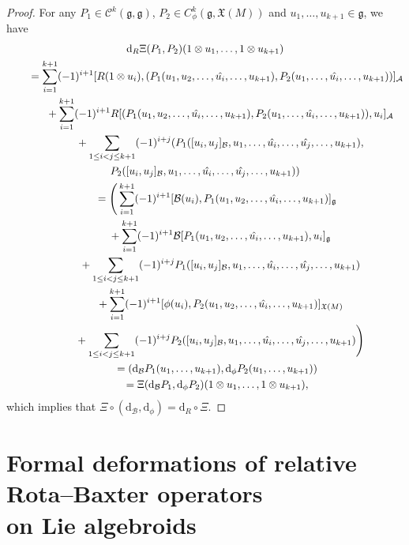 \documentclass[pdftex]{sigma}%
\numberwithin{equation}{section}
\newcommand{\g}{\mathfrak g}
\newcommand{\huaA}{\mathcal{A}}
\newcommand{\huaB}{\mathcal{B}}
\newcommand{\huaC}{\mathcal{C}}
\newcommand{\dM}{\mathrm{d}}
\begin{document}
\begin{proof}
	For any $P_1\in \huaC^k(\g,\g)$, $P_2\in C_\phi^k(\g,\mathfrak{X}(M))$ and $u_1,\dots,u_{k+1}\in \g$, we have
	\begin{gather*}
\dM_R\Xi(P_1,P_2)(1\otimes u_1,\dots, 1\otimes u_{k+1})
\\ \qquad
{}=\sum_{i=1}^{k+1}(-1)^{i+1} [R(1\otimes u_i),(P_1(u_1,u_2,\dots,\hat{u_i},\dots,u_{k+1}),P_2(u_1,\dots,\hat{u_i},\dots,u_{k+1}))]_{\huaA}
\\ \qquad\hphantom{=}
{}+\sum_{i=1}^{k+1}(-1)^{i+1} R[(P_1(u_1,u_2,\dots,\hat{u_i},\dots,u_{k+1}),P_2(u_1,\dots,\hat{u_i},\dots,u_{k+1})),u_i]_\huaA
\\ \qquad\hphantom{=}
{}+\sum_{1\leq i<j\leq {k+1}}(-1)^{i+j} (P_1([u_i, u_j]_\huaB, u_1,\dots,\hat{u_i},\dots,\hat{u_j},\dots,u_{k+1}),
\\
P_2([u_i,u_j]_\huaB,u_1,\dots,\hat{u_i},\dots,\hat{u_j},\dots,u_{k+1}))
\\ \qquad
{}=\Bigg(\sum_{i=1}^{k+1}(-1)^{i+1}[\huaB(u_i),P_1(u_1,u_2,\dots,\hat{u_i},\dots,u_{k+1})]_{\g}
\\ \qquad\hphantom{=}
{}+\sum_{i=1}^{k+1}(-1)^{i+1}\huaB[P_1(u_1,u_2,\dots,\hat{u_i},\dots,u_{k+1}),u_i]_\g
\\ \qquad\hphantom{=}
{}+\sum_{1\leq i<j\leq {k+1}}(-1)^{i+j}P_1([u_i, u_j]_\huaB,u_1,\dots,\hat{u_i},\dots,\hat{u_j},\dots,u_{k+1})
\\ \qquad\hphantom{=}	
{}+\sum_{i=1}^{k+1}(-1)^{i+1}[\phi(u_i),P_2(u_1,u_2,\dots,\hat{u_i},\dots,u_{k+1})]_{\mathfrak{X}(M)}
\\ \qquad\hphantom{=}
{}+\sum_{1\leq i<j\leq {k+1}}(-1)^{i+j}P_2([u_i, u_j]_\huaB,u_1,\dots,\hat{u_i},\dots,\hat{u_j},\dots,u_{k+1})\Bigg)
\\ \qquad
{}= (\dM_\huaB P_1	(u_1,\dots, u_{k+1}),\dM_\phi P_2	( u_1,\dots, u_{k+1}))
\\ \qquad	
{}=\Xi(\dM_\huaB P_1,\dM_\phi P_2)	(1\otimes u_1,\dots, 1\otimes u_{k+1}),
\end{gather*}
which implies that 	$\Xi\circ(\dM_\huaB,\dM_\phi)=\dM_R\circ \Xi$.
\end{proof}

\section[Formal deformations of relative Rota--Baxter operators on Lie algebroids]{Formal deformations of relative Rota--Baxter operators\\ on Lie algebroids}\label{sec:Cohomology-RRB-operator}
\end{document}
